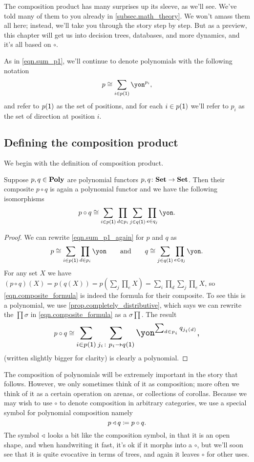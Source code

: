 \documentclass[DynamicalBook]{subfiles}
\begin{document}
The composition product has many surprises up its sleeve, as we'll see. We've told many of them to you already in \cref{subsec.math_theory}. We won't amass them all here; instead, we'll take you through the story step by step. But as a preview, this chapter will get us into decision trees, databases, and more dynamics, and it's all based on $\circ$.

As in \cref{eqn.sum_p1}, we'll continue to denote polynomials with the following notation
\begin{equation}\label{eqn.sum_p1_again}
p\cong\sum_{i\in p(\1)}\yon^{p_i},
\end{equation}
and refer to $p(\textsf{1})$ as the set of positions, and for each $i\in p(\textsf{1})$ we'll refer to $p_i$ as the set of direction at position $i$.

\subsection{Defining the composition product}
We begin with the definition of composition product.

\begin{proposition}\label{prop.poly_closed_comp}
Suppose $p,q\in\textbf{Poly}$ are polynomial functors $p,q\colon\textbf{Set}\to\textbf{Set}$. Then their composite $p\circ q$ is again a polynomial functor and we have the following isomorphisms
\[
p\circ q\cong\sum_{i\in p(\1)}\prod_{d\in p_i}\sum_{j\in q(\1)}\prod_{e\in q_j}\yon.
\]
\end{proposition}
\begin{proof}
We can rewrite \cref{eqn.sum_p1_again} for $p$ and $q$ as
\[
p\cong\sum_{i\in p(\1)}\prod_{d\in p_i}\yon
\qqand
q\cong\sum_{j\in q(\1)}\prod_{e\in q_j}\yon.
\]
For any set $X$ we have $(p\circ q)(X)=p(q(X))=p(\sum_j\prod_e X)=\sum_i\prod_d\sum_j\prod_eX$, so \eqref{eqn.composite_formula} is indeed the formula for their composite. To see this is a polynomial, we use \cref{prop.completely_distributive}, which says we can rewrite the $\prod\sigma$ in \eqref{eqn.composite_formula} as a $\sigma\prod$. The result 
\begin{equation}\label{eqn.composition_formula_sums_first}
  p\circ q\cong
  \scalebox{1.3}{$\displaystyle
  \sum_{i\in p(\1)}\sum_{j_i\colon p_i\to q(\1)}\yon^{\sum_{d\in p_i}q_{j_i(d)}},$}
\end{equation}
(written slightly bigger for clarity) is clearly a polynomial.
\end{proof}

The composition of polynomials will be extremely important in the story that follows. However, we only sometimes think of it as composition; more often we think of it as a certain operation on arenas, or collections of corollas. Because we may wish to use $\circ$ to denote composition in arbitrary categories, we use a special symbol for polynomial composition namely
\[
p\mathbin{\triangleleft} q\coloneqq p\circ q.
\]
The symbol $\mathbin{\triangleleft}$ looks a bit like the composition symbol, in that it is an open shape, and when handwriting it fast, it's ok if it morphs into a $\circ$, but we'll soon see that it is quite evocative in terms of trees, and again it leaves $\circ$ for other uses.
\end{document}
